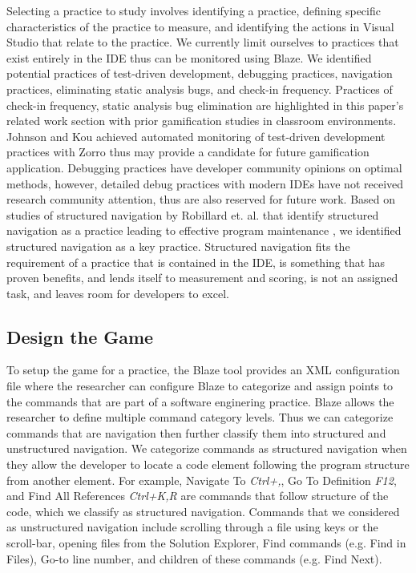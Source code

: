 \documentclass{sig-alternate}
\begin{document}
Selecting a practice to study involves identifying a practice, defining specific characteristics of the practice to measure, and identifying the actions in Visual Studio that relate to the practice.  We currently limit ourselves to practices that exist entirely in the IDE thus can be monitored using Blaze.  We identified potential practices of test-driven development, debugging practices, navigation practices,  eliminating static analysis bugs, and check-in frequency.  Practices of check-in frequency, static analysis bug elimination are highlighted in this paper's related work section with prior gamification studies in classroom environments.  Johnson and Kou achieved automated monitoring of test-driven development practices with Zorro thus may provide a candidate for future gamification application.   Debugging practices have developer community opinions on optimal methods, however, detailed debug practices with modern IDEs have not received research community attention, thus are also reserved for future work.  Based on studies of structured navigation by Robillard et. al. that identify structured navigation as a practice leading to effective program maintenance  \cite{wbsnipes:Robillard2004How}, we identified structured navigation as a key practice.   Structured navigation fits the requirement of a practice that is contained in the IDE, is something that has proven benefits, and lends itself to measurement and scoring, is not an assigned task, and leaves room for developers to excel.  

\subsection{Design the Game}

To setup the game for a practice, the Blaze tool provides an XML configuration file where the researcher can configure Blaze to categorize and assign points to the commands that are part of a software enginering practice.  Blaze allows the researcher to define multiple command category levels.  Thus we can categorize commands that are navigation then further classify them into structured and unstructured navigation.  We categorize commands as structured navigation when they allow the developer to locate a code element following the program structure from another element.  For example, Navigate To \textit{Ctrl+,}, Go To Definition \textit{F12}, and Find All References \textit{Ctrl+K,R} are commands that follow structure of the code, which we classify as structured navigation.
Commands that we considered as unstructured navigation include scrolling through a file using keys or the scroll-bar, opening files from the Solution Explorer, Find commands (e.g. Find in Files), Go-to line number, and children of these commands (e.g. Find Next).
\end{document}
